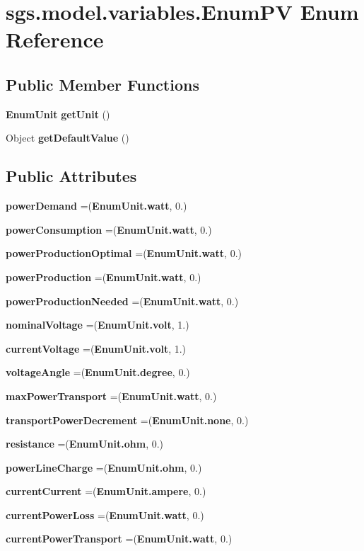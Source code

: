 \section{sgs.\-model.\-variables.\-Enum\-P\-V Enum Reference}
\label{enumsgs_1_1model_1_1variables_1_1_enum_p_v}
\subsection*{Public Member Functions}
\begin{DoxyCompactItemize}
\item 
{\bf Enum\-Unit} {\bf get\-Unit} ()
\item 
Object {\bf get\-Default\-Value} ()
\end{DoxyCompactItemize}
\subsection*{Public Attributes}
\begin{DoxyCompactItemize}
\item 
{\bf power\-Demand} =({\bf Enum\-Unit.\-watt}, 0.)
\item 
{\bf power\-Consumption} =({\bf Enum\-Unit.\-watt}, 0.)
\item 
{\bf power\-Production\-Optimal} =({\bf Enum\-Unit.\-watt}, 0.)
\item 
{\bf power\-Production} =({\bf Enum\-Unit.\-watt}, 0.)
\item 
{\bf power\-Production\-Needed} =({\bf Enum\-Unit.\-watt}, 0.)
\item 
{\bf nominal\-Voltage} =({\bf Enum\-Unit.\-volt}, 1.)
\item 
{\bf current\-Voltage} =({\bf Enum\-Unit.\-volt}, 1.)
\item 
{\bf voltage\-Angle} =({\bf Enum\-Unit.\-degree}, 0.)
\item 
{\bf max\-Power\-Transport} =({\bf Enum\-Unit.\-watt}, 0.)
\item 
{\bf transport\-Power\-Decrement} =({\bf Enum\-Unit.\-none}, 0.)
\item 
{\bf resistance} =({\bf Enum\-Unit.\-ohm}, 0.)
\item 
{\bf power\-Line\-Charge} =({\bf Enum\-Unit.\-ohm}, 0.)
\item 
{\bf current\-Current} =({\bf Enum\-Unit.\-ampere}, 0.)
\item 
{\bf current\-Power\-Loss} =({\bf Enum\-Unit.\-watt}, 0.)
\item 
{\bf current\-Power\-Transport} =({\bf Enum\-Unit.\-watt}, 0.)
\end{DoxyCompactItemize}


